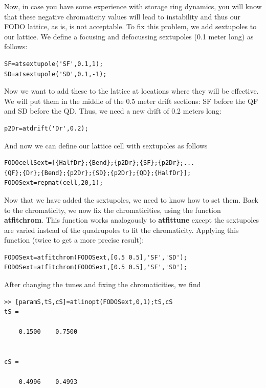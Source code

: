 \documentclass[acus]{article}
\newcommand{\mfun}[1]{{\bf{#1}}}
\begin{document}
Now, in case you have some experience with storage ring dynamics,
you will know that these negative chromaticity values will lead
to instability and thus our FODO lattice, as is, is not acceptable.
To fix this problem, we add sextupoles to our lattice.
We define a focusing and defocussing sextupoles (0.1 meter long)
as follows:
\begin{verbatim}
SF=atsextupole('SF',0.1,1);
SD=atsextupole('SD',0.1,-1);
\end{verbatim}
Now we want to add these to the lattice at locations where they will
be effective.  We will put them in the middle of the 0.5 meter drift
sections: SF before the QF and SD before the QD.  Thus, we need a 
new drift of 0.2 meters long:
\begin{verbatim}
p2Dr=atdrift('Dr',0.2);
\end{verbatim}
And now we can define our lattice cell with sextupoles as follows
\begin{verbatim}
FODOcellSext=[{HalfDr};{Bend};{p2Dr};{SF};{p2Dr};...
{QF};{Dr};{Bend};{p2Dr};{SD};{p2Dr};{QD};{HalfDr}];
FODOSext=repmat(cell,20,1);
\end{verbatim}

Now that we have added the sextupoles, we need to know how to set them.
Back to the chromaticity, we now fix the chromaticities, using the function
\mfun{atfitchrom}.  This function works analogously to \mfun{atfittune} except
the sextupoles are varied instead of the quadrupoles to fit the chromaticity.
Applying this function (twice to get a more precise result):
\begin{verbatim}
FODOSext=atfitchrom(FODOSext,[0.5 0.5],'SF','SD');
FODOSext=atfitchrom(FODOSext,[0.5 0.5],'SF','SD');
\end{verbatim}

After changing the tunes and fixing the chromaticities, we find
\begin{verbatim}
>> [paramS,tS,cS]=atlinopt(FODOSext,0,1);tS,cS
tS =

    0.1500    0.7500


cS =

    0.4996    0.4993
\end{verbatim}
\end{document}
